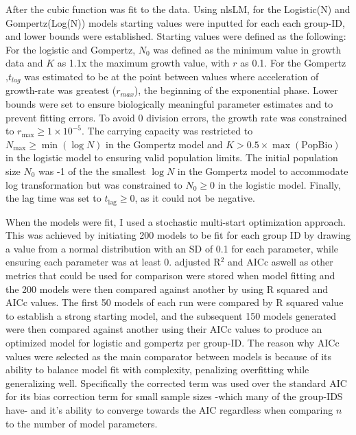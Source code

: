 \documentclass[11pt]{article}
\begin{document}
After the cubic function was fit to the data. Using nlsLM, for the Logistic(N) and Gompertz(Log(N)) models starting values were inputted for each each group-ID, and lower bounds were established. Starting values were defined as the following: For the logistic and Gompertz, $N_0$ was defined as the minimum value in growth data and $K$ as 1.1x the maximum growth value, with $r$ as 0.1. For the Gompertz ,$t_{lag}$ was estimated to be at the point between values where acceleration of growth-rate was greatest ($r_{max}$), the beginning of the exponential phase. Lower bounds were set to ensure biologically meaningful parameter estimates and to prevent fitting errors.  
To avoid 0 division errors, the growth rate was constrained to \( r_{\text{max}} \geq 1 \times 10^{-5} \).  
The carrying capacity was restricted to \( N_{\max} \geq \min(\log N) \) in the Gompertz model and \( K > 0.5 \times \max(\text{PopBio}) \) in the logistic model to ensuring valid population limits.  
The initial population size \( N_0 \) was -1 of the the smallest \(\log N\) in the Gompertz model to accommodate log transformation but was constrained to \( N_0 \geq 0 \) in the logistic model.  
Finally, the lag time was set to \( t_{\text{lag}} \geq 0 \), as it could not be negative.  

          
\setlength{\parskip}{1.2em} %

When the models were fit, I used a stochastic multi-start optimization approach. This was achieved by initiating 200 models to be fit for each group ID by drawing a value from a normal distribution with an SD of 0.1 for each parameter, while ensuring each parameter was at least 0. adjusted R$^2$ and AICc aswell as other metrics that could be used for comparison were stored when model fitting and the 200 models were then compared against another by using R squared and AICc values. The first 50 models of each run were compared by R squared value to establish a strong starting model, and the subsequent 150 models generated were then compared against another using their AICc values to produce an optimized model for logistic and gompertz per group-ID. The reason why AICc values were selected as the main comparator between models is because of its ability to balance model fit with complexity, penalizing overfitting while generalizing well. Specifically the corrected term was used over the standard AIC for its bias correction term for small sample sizes -which many of the group-IDS have- and it's ability to converge towards the AIC regardless when comparing $n$ to the number of model parameters\cite{anderson2004model, johnson2004model}. 
\setlength{\parskip}{1.2em} %
\end{document}
